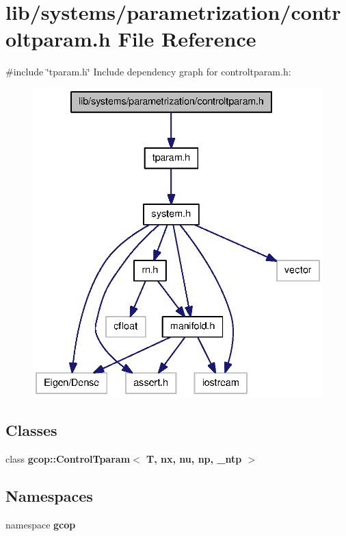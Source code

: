 \section{lib/systems/parametrization/controltparam.h \-File \-Reference}
\label{controltparam_8h}
{\ttfamily \#include \char`\"{}tparam.\-h\char`\"{}}\*
\-Include dependency graph for controltparam.\-h\-:
\nopagebreak
\begin{figure}[H]
\begin{center}
\leavevmode
\includegraphics[width=336pt]{controltparam_8h__incl}
\end{center}
\end{figure}
\subsection*{\-Classes}
\begin{DoxyCompactItemize}
\item 
class {\bf gcop\-::\-Control\-Tparam$<$ T, nx, nu, np, \-\_\-ntp $>$}
\end{DoxyCompactItemize}
\subsection*{\-Namespaces}
\begin{DoxyCompactItemize}
\item 
namespace {\bf gcop}
\end{DoxyCompactItemize}
